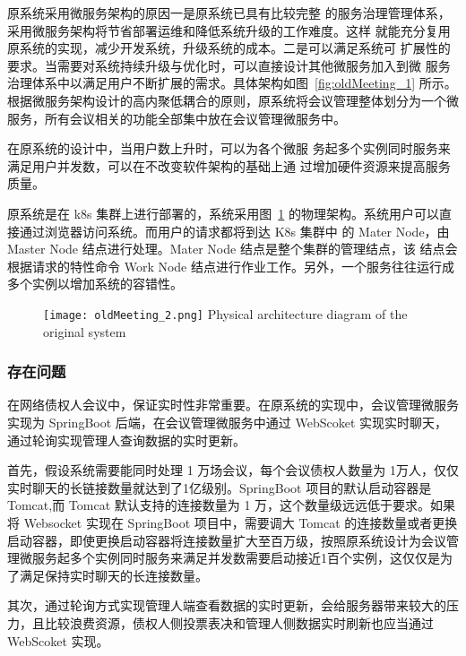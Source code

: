 原系统采用微服务架构的原因一是原系统已具有比较完整
的服务治理管理体系，采用微服务架构将节省部署运维和降低系统升级的工作难度。这样
就能充分复用原系统的实现，减少开发系统，升级系统的成本。二是可以满足系统可
扩展性的要求。当需要对系统持续升级与优化时，可以直接设计其他微服务加入到微
服务治理体系中以满足用户不断扩展的需求。具体架构如图~\ref{fig:oldMeeting_1}\cite{Wang2021} 所示。根据微服务架构设计的高内聚低耦合的原则，原系统将会议管理整体划分为一个微服务，所有会议相关的功能全部集中放在会议管理微服务中。

在原系统的设计中，当用户数上升时，可以为各个微服
务起多个实例同时服务来满足用户并发数，可以在不改变软件架构的基础上通
过增加硬件资源来提高服务质量。

原系统是在 k8s 集群上进行部署的，系统采用图~\ref{fig:oldMeeting_2}\cite{Wang2021}
的物理架构。系统用户可以直接通过浏览器访问系统。而用户的请求都将到达 K8s 集群中
的 Mater Node，由 Master Node 结点进行处理。Mater Node 结点是整个集群的管理结点，该
结点会根据请求的特性命令 Work Node 结点进行作业工作。另外，一个服务往往运行成多个实例以增加系统的容错性。

\begin{figure}[!htp]
  \centering
  \texttt{[image: oldMeeting\_2.png]}
    {Physical architecture diagram of the original system\cite{Wang2021}}
 \label{fig:oldMeeting_2}
\end{figure}

\nocite{Wang2021}
\subsubsection{存在问题}

在网络债权人会议中，保证实时性非常重要。在原系统的实现中，会议管理微服务实现为 SpringBoot 后端，在会议管理微服务中通过 WebScoket 实现实时聊天，通过轮询实现管理人查询数据的实时更新。

首先，假设系统需要能同时处理 1 万场会议，每个会议债权人数量为 1万人，仅仅实时聊天的长链接数量就达到了1亿级别。SpringBoot 项目的默认启动容器是 Tomcat,而 Tomcat 默认支持的连接数量为 1 万，这个数量级远远低于要求。如果将 Websocket 实现在 SpringBoot 项目中，需要调大 Tomcat 的连接数量或者更换启动容器，即使更换启动容器将连接数量扩大至百万级，按照原系统设计为会议管理微服务起多个实例同时服务来满足并发数需要启动接近1百个实例，这仅仅是为了满足保持实时聊天的长连接数量。

其次，通过轮询方式实现管理人端查看数据的实时更新，会给服务器带来较大的压力，且比较浪费资源，债权人侧投票表决和管理人侧数据实时刷新也应当通过 WebScoket 实现。

